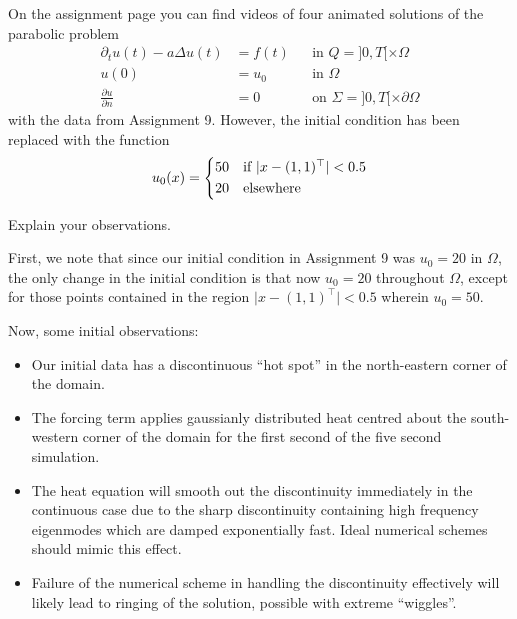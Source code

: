 On the assignment page you can find videos of four animated solutions of the parabolic problem
\begin{equation}\tag{H}\label{eq:heat}
\begin{aligned}
\partial_t u(t) - a \Delta u(t) &= f(t) && \text{in } Q = ]0,T[ \times \Omega\\
u(0) &= u_0 && \text{in } \Omega\\
\frac{\partial u}{\partial n} &= 0 && \text{on } \Sigma = ]0,T[ \times \partial \Omega
\end{aligned}
\end{equation}
with the data from Assignment 9. However, the initial condition has been replaced with the function
\begin{equation*}
u_0(x) =
\begin{dcases*}
50 & if $\lvert x - (1,1)^\top \rvert < 0.5$\\
20 & elsewhere
\end{dcases*}
\end{equation*}

Explain your observations.

\vspace{0.5cm}
\begin{solution}
First, we note that since our initial condition in Assignment 9 was $u_0 = 20$ in $\Omega$, the only change in the initial condition is that now $u_0 = 20$ throughout $\Omega$, except for those points contained in the region $\lvert x - (1,1)^\top \rvert < 0.5$ wherein $u_0 = 50$.

Now, some initial observations:
\begin{itemize}
\item Our initial data has a discontinuous ``hot spot'' in the north-eastern corner of the domain.
\item The forcing term applies gaussianly distributed heat centred about the south-western corner of the domain for the first second of the five second simulation.
\item The heat equation will smooth out the discontinuity immediately in the continuous case due to the sharp discontinuity containing high frequency eigenmodes which are damped exponentially fast.
Ideal numerical schemes should mimic this effect.
\item Failure of the numerical scheme in handling the discontinuity effectively will likely lead to ringing of the solution, possible with extreme ``wiggles''.
\end{itemize}


\end{solution}


